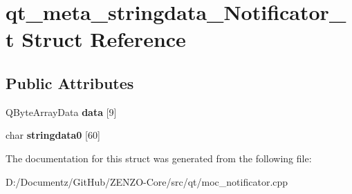\hypertarget{structqt__meta__stringdata___notificator__t}{}\section{qt\+\_\+meta\+\_\+stringdata\+\_\+\+Notificator\+\_\+t Struct Reference}
\label{structqt__meta__stringdata___notificator__t}
\subsection*{Public Attributes}
\begin{DoxyCompactItemize}
\item 
\mbox{\label{structqt__meta__stringdata___notificator__t_ac6d300f412b13dbacbce135785090248}} 
Q\+Byte\+Array\+Data {\bfseries data} \mbox{[}9\mbox{]}
\item 
\mbox{\label{structqt__meta__stringdata___notificator__t_a9ce85c046a7336ebc14a7da94bbba729}} 
char {\bfseries stringdata0} \mbox{[}60\mbox{]}
\end{DoxyCompactItemize}


The documentation for this struct was generated from the following file\+:\begin{DoxyCompactItemize}
\item 
D\+:/\+Documentz/\+Git\+Hub/\+Z\+E\+N\+Z\+O-\/\+Core/src/qt/moc\+\_\+notificator.\+cpp\end{DoxyCompactItemize}
